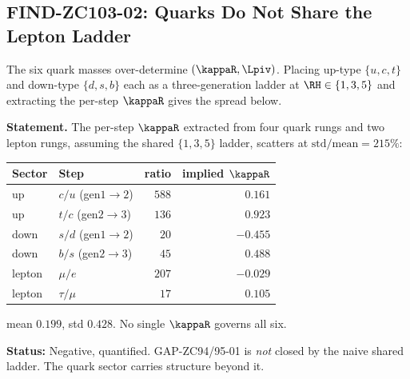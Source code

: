 \documentclass[12pt, a4paper]{article}
\begin{document}

\subsection{FIND-ZC103-02: Quarks Do Not Share the Lepton Ladder}
\label{sec:quark-zc103}

The six quark masses over-determine $(\kappaR,\Lpiv)$. Placing up-type
$\{u,c,t\}$ and down-type $\{d,s,b\}$ each as a three-generation ladder at
$\RH\in\{1,3,5\}$ and extracting the per-step $\kappaR$ gives the spread below.

\begin{formalbox}[title={FIND-ZC103-02: 215\% scatter across six rungs ($R_1$, numerical)}]

\textbf{Statement.} The per-step $\kappaR$ extracted from four quark rungs and
two lepton rungs, assuming the shared $\{1,3,5\}$ ladder, scatters at
$\mathrm{std}/\mathrm{mean}=215\%$:
\begin{center}
{\small\renewcommand{\arraystretch}{1.25}
\begin{tabular}{@{}llrr@{}}
\toprule
Sector & Step & ratio & implied $\kappaR$ \\
\midrule
up   & $c/u$ (gen$1{\to}2$) & $588$  & $0.161$ \\
up   & $t/c$ (gen$2{\to}3$) & $136$  & $0.923$ \\
down & $s/d$ (gen$1{\to}2$) & $20$   & $-0.455$ \\
down & $b/s$ (gen$2{\to}3$) & $45$   & $0.488$ \\
lepton & $\mu/e$            & $207$  & $-0.029$ \\
lepton & $\tau/\mu$         & $17$   & $0.105$ \\
\bottomrule
\end{tabular}}
\end{center}
mean $0.199$, std $0.428$. No single $\kappaR$ governs all six.

\textbf{Status:} Negative, quantified. GAP-ZC94/95-01 is \emph{not} closed by
the naive shared ladder. The quark sector carries structure beyond it.
\end{formalbox}
\end{document}
